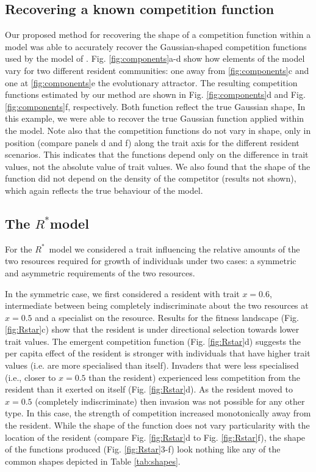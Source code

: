 \documentclass[a4paper,11pt]{article}
\newcommand{\Rstar}{\ensuremath{R^*}}
\begin{document}
\subsection{Recovering a known competition function}

Our proposed method for recovering the shape of a competition function within a model was able to accurately recover the Gaussian-shaped competition functions used by the model of \citet{Dieckmann-1999}. Fig. \ref{fig:components}a-d show how elements of the model vary for two different resident communities: one away from \ref{fig:components}c and one at \ref{fig:components}e the evolutionary attractor. The resulting competition functions estimated by our method are shown in Fig. \ref{fig:components}d and Fig. \ref{fig:components}f, respectively. Both function reflect the true Gaussian shape, In this example, we were able to recover the true Gaussian function applied within the model. Note also that the competition functions do not vary in shape, only in position (compare panels d and f) along the trait axis for the different resident scenarios. This indicates that the functions depend only on the difference in trait values, not the absolute value of trait values. We also found that the shape of the function did not depend on the density of the competitor (results not shown), which again reflects the true behaviour of the model.

\subsection{The \Rstar model}

For the \Rstar\ model we considered a trait influencing the relative amounts of the two resources required for growth of individuals under two cases: a symmetric and asymmetric requirements of the two resources.

In the symmetric case, we first considered a resident with trait $x = 0.6$, intermediate between being completely indiscriminate about the two resources at $x = 0.5$ and a specialist on the resource. Results for the fitness landscape (Fig. \ref{fig:Rstar}c) show that the resident is under directional selection towards lower trait values. The emergent competition function (Fig. \ref{fig:Rstar}d) suggests the per capita effect of the resident is stronger with individuals that have higher trait values (i.e. are more specialised than itself). Invaders that were less specialised (i.e., closer to $x = 0.5$ than the resident) experienced less competition from the resident than it exerted on itself (Fig. \ref{fig:Rstar}d). As the resident moved to $x = 0.5$ (completely indiscriminate) then invasion was not possible for any other type. In this case, the strength of competition increased monotonically away from the resident. While the shape of the function does not vary particularity with the location of the resident (compare Fig. \ref{fig:Rstar}d to Fig. \ref{fig:Rstar}f), the shape of the functions produced (Fig. \ref{fig:Rstar}3-f) look nothing like any of the common shapes depicted in Table \ref{tab:shapes}.
\end{document}
